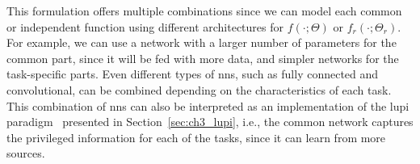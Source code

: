 This formulation offers multiple combinations since we can model each common or independent function using different architectures for $f(\cdot; \Theta)$ or $f_r(\cdot; \Theta_r)$.
%
For example, we can use a network with a larger number of parameters for the common part, since it will be fed with more data, and simpler networks for the task-specific parts.
%
Even different types of \acrshort{nns}, such as fully connected and convolutional, can be combined depending on the characteristics of each task.
This combination of \acrshort{nns} can also be interpreted as an implementation of the \acrfull{lupi} paradigm~\citep{VapnikI15a} presented in Section~\ref{sec:ch3_lupi}, i.e., the common network captures the privileged information for each of the tasks, since it can learn from more sources.
%

